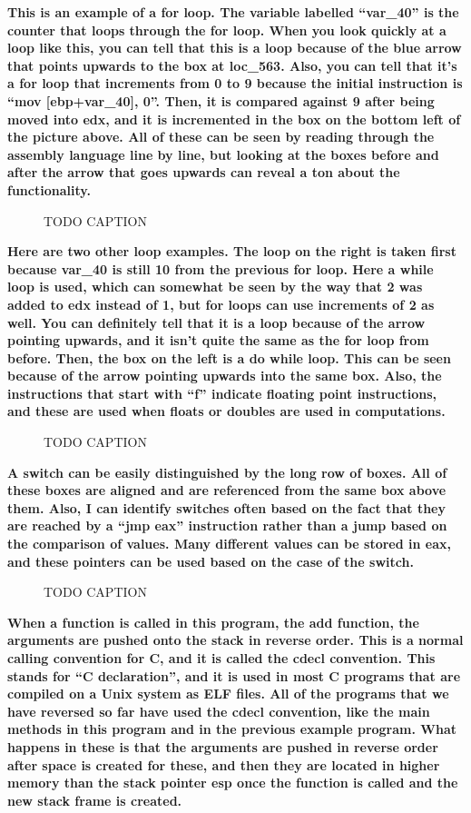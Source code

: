 \documentclass[letterpaper]{article}
\newcommand{\sitfig}[3]{
\begin{figure}[H]
\centering
\makebox[\textwidth][c]{
#2
}
\caption{#3}
\label{#1}
\end{figure}
}
\newcommand{\sitgfx}[4][scale=1.0]{
\sitfig{#3}{\texttt{[image: \#2]}}{#4}
}
\begin{document}
\textbf{This is an example of a for loop. The variable labelled ``var\_40'' is the counter that loops through the for
loop. When you look quickly at a loop like this, you can tell that this is a loop because of the blue arrow that points
upwards to the box at loc\_563. Also, you can tell that it's a for loop that increments from 0 to 9 because the initial
instruction is ``mov [ebp+var\_40], 0''. Then, it is compared against 9 after being moved into edx, and it is
incremented in the box on the bottom left of the picture above. All of these can be seen by reading through the
assembly language line by line, but looking at the boxes before and after the arrow that goes upwards can reveal a ton
about the functionality.}

  
\sitgfx[width=6.5in,height=3.9374in]{FINALWORKINGDOCFORMERLYPRECURSOR-img068.png}{fig:unk}{TODO CAPTION}
 

\textbf{Here are two other loop examples. The loop on the right is taken first because var\_40 is still 10 from the
previous for loop. Here a while loop is used, which can somewhat be seen by the way that 2 was added to edx instead of
1, but for loops can use increments of 2 as well. You can definitely tell that it is a loop because of the arrow
pointing upwards, and it isn't quite the same as the for loop from before. Then, the box on the left is a do while
loop. This can be seen because of the arrow pointing upwards into the same box. Also, the instructions that start with 
{}``f'' indicate floating point instructions, and these are used when floats or doubles are used in computations.}

  
\sitgfx[width=6.4898in,height=0.6252in]{FINALWORKINGDOCFORMERLYPRECURSOR-img069.png}{fig:unk}{TODO CAPTION}
 

\textbf{A switch can be easily distinguished by the long row of boxes. All of these boxes are aligned and are referenced
from the same box above them. Also, I can identify switches often based on the fact that they are reached by a ``jmp
eax'' instruction rather than a jump based on the comparison of values. Many different values can be stored in eax, and
these pointers can be used based on the case of the switch.}

  
\sitgfx[width=2.8646in,height=1.2083in]{FINALWORKINGDOCFORMERLYPRECURSOR-img070.png}{fig:unk}{TODO CAPTION}
 

\textbf{When a function is called in this program, the add function, the arguments are pushed onto the stack in reverse
order. This is a normal calling convention for C, and it is called the cdecl convention. This stands for ``C
declaration'', and it is used in most C programs that are compiled on a Unix system as ELF files. All of the programs
that we have reversed so far have used the cdecl convention, like the main methods in this program and in the previous
example program. What happens in these is that the arguments are pushed in reverse order after space is created for
these, and then they are located in higher memory than the stack pointer esp once the function is called and the new
stack frame is created. }
\end{document}
